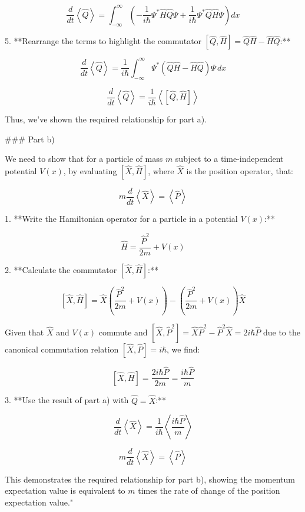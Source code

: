 \[ \frac{d}{dt}\left<\hat{Q}\right> = \int_{-\infty}^{\infty} \left( -\frac{1}{i\hbar}\Psi^{*} \hat{H} \hat{Q} \Psi + \frac{1}{i\hbar}\Psi^{*} \hat{Q} \hat{H} \Psi \right) dx \]

5. **Rearrange the terms to highlight the commutator \( \left[ \hat{Q}, \hat{H} \right] = \hat{Q}\hat{H} - \hat{H}\hat{Q} \):**

\[ \frac{d}{dt}\left<\hat{Q}\right> = \frac{1}{i\hbar}\int_{-\infty}^{\infty} \Psi^{*} \left( \hat{Q}\hat{H} - \hat{H}\hat{Q} \right) \Psi \, dx \]

\[ \frac{d}{dt}\left<\hat{Q}\right> = \frac{1}{i\hbar}\left< \left[ \hat{Q}, \hat{H} \right] \right> \]

Thus, we've shown the required relationship for part a).

### Part b)

We need to show that for a particle of mass \( m \) subject to a time-independent potential \( V(x) \), by evaluating \( \left[ \hat{X}, \hat{H}\right] \), where \( \hat{X} \) is the position operator, that:

\[ m\frac{d}{dt}\left<\hat{X}\right> = \left<\hat{P}\right> \]

1. **Write the Hamiltonian operator for a particle in a potential \( V(x) \):**

\[ \hat{H} = \frac{\hat{P}^2}{2m} + V(x) \]

2. **Calculate the commutator \( \left[ \hat{X}, \hat{H}\right] \):**

\[ \left[ \hat{X}, \hat{H}\right] = \hat{X}\left(\frac{\hat{P}^2}{2m} + V(x)\right) - \left(\frac{\hat{P}^2}{2m} + V(x)\right)\hat{X} \]

Given that \( \hat{X} \) and \( V(x) \) commute and \( \left[ \hat{X}, \hat{P}^2 \right] = \hat{X}\hat{P}^2 - \hat{P}^2\hat{X} = 2i\hbar\hat{P} \) due to the canonical commutation relation \( \left[ \hat{X}, \hat{P} \right] = i\hbar \), we find:

\[ \left[ \hat{X}, \hat{H}\right] = \frac{2i\hbar\hat{P}}{2m} = \frac{i\hbar\hat{P}}{m} \]

3. **Use the result of part a) with \( \hat{Q} = \hat{X} \):**

\[ \frac{d}{dt}\left<\hat{X}\right> = \frac{1}{i\hbar}\left< \frac{i\hbar\hat{P}}{m} \right> \]

\[ m\frac{d}{dt}\left<\hat{X}\right> = \left<\hat{P}\right> \]

This demonstrates the required relationship for part b), showing the momentum expectation value is equivalent to \( m \) times the rate of change of the position expectation value."

